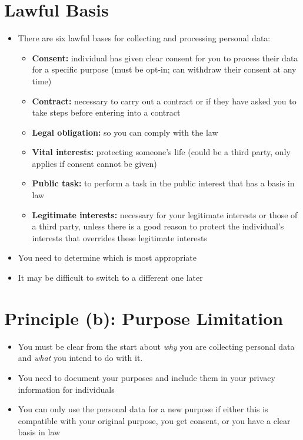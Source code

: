 \documentclass{article}
\begin{document}
\section{Lawful Basis}
\begin{itemize}
\item There are six lawful bases for collecting and processing personal data:
\begin{itemize}
\item {\bf Consent:} individual has given clear consent for you to process their data for a specific purpose (must be opt-in; can withdraw their consent at any time)
\item {\bf Contract:} necessary to carry out a contract or if they have asked you to take steps before entering into a contract
\item {\bf Legal obligation:} so you can comply with the law
\item {\bf Vital interests:} protecting someone's life (could be a third party, only applies if consent cannot be given)
\item {\bf Public task:} to perform a task in the public interest that has a basis in law
\item {\bf Legitimate interests:} necessary for your legitimate interests or those of a third party, unless there is a good reason to protect the individual's interests that overrides these legitimate interests
\end{itemize}
\item You need to determine which is most appropriate
\item It may be difficult to switch to a different one later
\end{itemize}



\section{Principle (b): Purpose Limitation}
\begin{itemize}
\item You must be clear from the start about {\em why} you are collecting personal data and {\em what} you intend to do with it.
\item You need to document your purposes and include them in your privacy information for individuals
\item You can only use the personal data for a new purpose if either this is compatible with your original purpose, you get consent, or you have a clear basis in law
\end{itemize}
\end{document}
